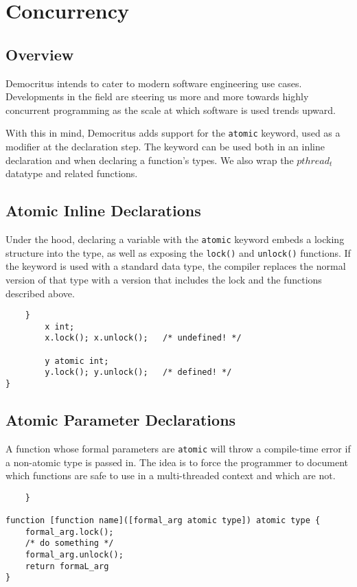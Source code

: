 \section{Concurrency}
	\subsection{Overview}
		Democritus intends to cater to modern software engineering use cases. Developments in the field are steering us more and more towards highly concurrent programming as the scale at which software is used trends upward.

		\vspace{5mm}
		\noindent
		With this in mind, Democritus adds support for the \texttt{atomic} keyword, used as a modifier at the declaration step. The keyword can be used both in an inline declaration and when declaring a function's types. We also wrap the \texttt{$pthread_t$} datatype and related functions.

	\subsection{Atomic Inline Declarations}
		Under the hood, declaring a variable with the \texttt{atomic} keyword embeds a locking structure into the type, as well as exposing the \texttt{lock()} and \texttt{unlock()} functions. If the keyword is used with a standard data type, the compiler replaces the normal version of that type with a version that includes the lock and the functions described above.

		\begin{lstlisting}
	}
		x int;
		x.lock(); x.unlock();	/* undefined! */

		y atomic int;
		y.lock(); y.unlock();	/* defined! */
}
		\end{lstlisting}

	\subsection{Atomic Parameter Declarations}
		A function whose formal parameters are \texttt{atomic} will throw a compile-time error if a non-atomic type is passed in. The idea is to force the programmer to document which functions are safe to use in a multi-threaded context and which are not.

		\begin{lstlisting}
	}
	
function [function name]([formal_arg atomic type]) atomic type {
	formal_arg.lock();
	/* do something */
	formal_arg.unlock();
	return formaL_arg
}
		\end{lstlisting}


